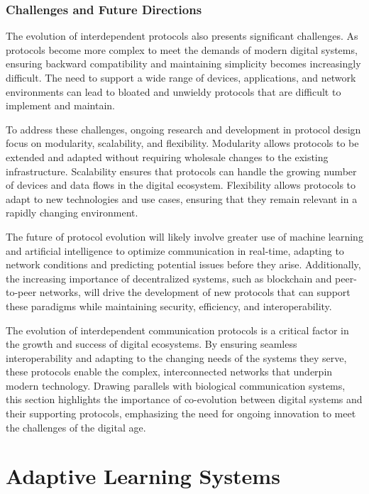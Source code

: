 \documentclass[12pt,twoside]{article}
\begin{document}
\subsubsection{Challenges and Future Directions}

The evolution of interdependent protocols also presents significant challenges. As protocols become more complex to meet the demands of modern digital systems, ensuring backward compatibility and maintaining simplicity becomes increasingly difficult. The need to support a wide range of devices, applications, and network environments can lead to bloated and unwieldy protocols that are difficult to implement and maintain.

To address these challenges, ongoing research and development in protocol design focus on modularity, scalability, and flexibility. Modularity allows protocols to be extended and adapted without requiring wholesale changes to the existing infrastructure. Scalability ensures that protocols can handle the growing number of devices and data flows in the digital ecosystem. Flexibility allows protocols to adapt to new technologies and use cases, ensuring that they remain relevant in a rapidly changing environment.

The future of protocol evolution will likely involve greater use of machine learning and artificial intelligence to optimize communication in real-time, adapting to network conditions and predicting potential issues before they arise. Additionally, the increasing importance of decentralized systems, such as blockchain and peer-to-peer networks, will drive the development of new protocols that can support these paradigms while maintaining security, efficiency, and interoperability.

The evolution of interdependent communication protocols is a critical factor in the growth and success of digital ecosystems. By ensuring seamless interoperability and adapting to the changing needs of the systems they serve, these protocols enable the complex, interconnected networks that underpin modern technology. Drawing parallels with biological communication systems, this section highlights the importance of co-evolution between digital systems and their supporting protocols, emphasizing the need for ongoing innovation to meet the challenges of the digital age.

\section{Adaptive Learning Systems}
\end{document}
